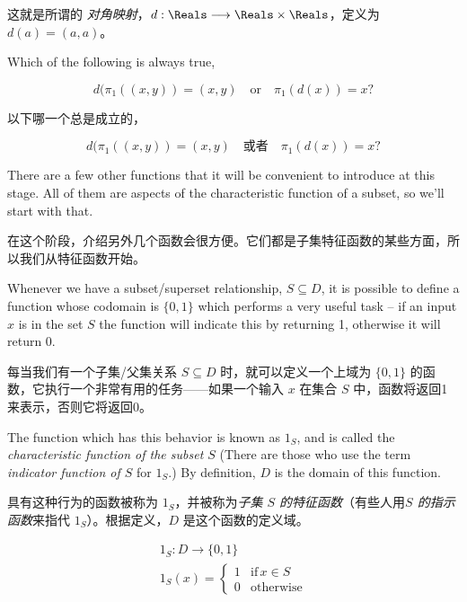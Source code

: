 这就是所谓的 \emph{对角映射}，$d:\Reals \longrightarrow \Reals \times \Reals$，定义为 $d(a) = (a,a)$。

\begin{exer}
Which of the following is always true,

\[ d(\pi_1((x,y)) = (x,y) \quad \mbox{or} \quad \pi_1(d(x)) = x? \] 
\end{exer}

\begin{exer}
以下哪一个总是成立的，

\[ d(\pi_1((x,y)) = (x,y) \quad \mbox{或者} \quad \pi_1(d(x)) = x? \] 
\end{exer}

There are a few other functions that it will be convenient to 
introduce at this stage.  All of them are aspects of the 
characteristic function of a subset, so we'll start with that.

在这个阶段，介绍另外几个函数会很方便。它们都是子集特征函数的某些方面，所以我们从特征函数开始。

Whenever we have a subset/superset relationship, $S \subseteq D$,  
it is possible to define a function whose codomain is $\{0,1\}$
which performs a very useful task -- if an input $x$ is in the 
set $S$ the function will indicate this by returning 1, otherwise
it will return 0.   

每当我们有一个子集/父集关系 $S \subseteq D$ 时，就可以定义一个上域为 $\{0,1\}$ 的函数，它执行一个非常有用的任务——如果一个输入 $x$ 在集合 $S$ 中，函数将返回1来表示，否则它将返回0。

The function which has this behavior is known 
as $1_S$, and is called the 
\emph{characteristic function of the subset $S$} (There are those
who use the term \emph{indicator function of $S$}
for $1_S$.)  By definition,
$D$ is the domain of this function.  

具有这种行为的函数被称为 $1_S$，并被称为\emph{子集 $S$ 的特征函数}（有些人用\emph{$S$ 的指示函数}来指代 $1_S$）。根据定义，$D$ 是这个函数的定义域。

\begin{gather*}
1_S: D \longrightarrow \{0,1\} \\
1_S(x) = \left\{ \begin{array}{cl} 1 & \mbox{if} \, x \in S \\ 0 & \mbox{otherwise} \end{array} \right.
\end{gather*}

